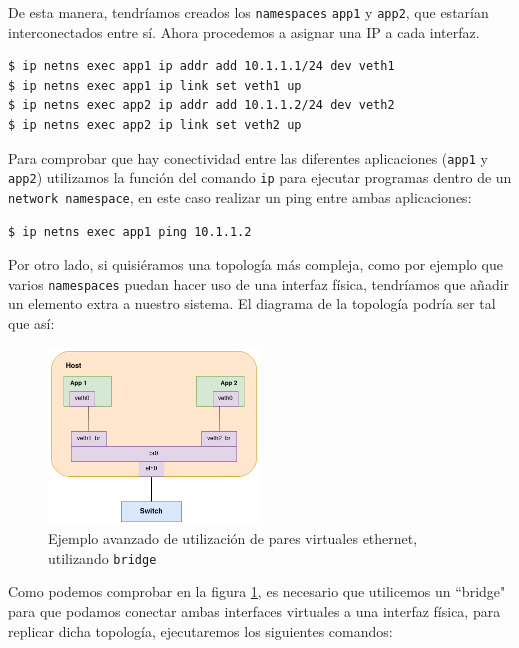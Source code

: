 \documentclass[a4paper, oneside, 12pt]{book}
\begin{document}
	\noindent De esta manera, tendríamos creados los \texttt{namespaces} \texttt{app1} y \texttt{app2}, que estarían interconectados entre sí. Ahora procedemos a asignar una IP a cada interfaz. 
	
	\begin{verbatim}
$ ip netns exec app1 ip addr add 10.1.1.1/24 dev veth1
$ ip netns exec app1 ip link set veth1 up
$ ip netns exec app2 ip addr add 10.1.1.2/24 dev veth2
$ ip netns exec app2 ip link set veth2 up
	\end{verbatim}
	
	\pagebreak

	\noindent Para comprobar que hay conectividad entre las diferentes aplicaciones (\texttt{app1} y \texttt{app2}) utilizamos la función del comando \texttt{ip} para ejecutar programas dentro de un \texttt{network namespace}, en este caso realizar un ping entre ambas aplicaciones:
	
	\begin{verbatim}
$ ip netns exec app1 ping 10.1.1.2
	\end{verbatim}
	
	\noindent Por otro lado, si quisiéramos una topología más compleja, como por ejemplo que varios \texttt{namespaces} puedan hacer uso de una interfaz física, tendríamos que añadir un elemento extra a nuestro sistema. El diagrama de la topología podría ser tal que así:
	
	\begin{figure}[h!]
		\begin{center}
			\includegraphics[width=0.5\textwidth]{img/veth_ej2.png}
			\caption{Ejemplo avanzado de utilización de pares virtuales ethernet, utilizando \texttt{bridge}}
			\label{ej2 veth}
		\end{center}
	\end{figure}
	
	\noindent Como podemos comprobar en la figura \ref{ej2 veth}, es necesario que utilicemos un ``bridge" para que podamos conectar ambas interfaces virtuales a una interfaz física, para replicar dicha topología, ejecutaremos los siguientes comandos:
	
\end{document}
